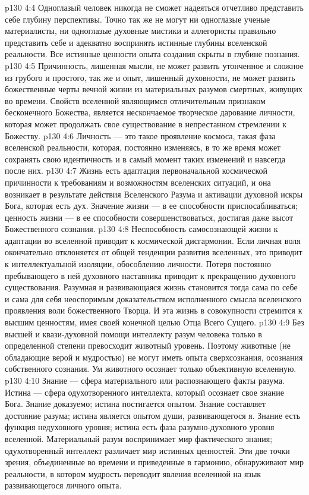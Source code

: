 \vs p130 4:4 Одноглазый человек никогда не сможет надеяться отчетливо представить себе глубину перспективы. Точно так же не могут ни одноглазые ученые материалисты, ни одноглазые духовные мистики и аллегористы правильно представить себе и адекватно воспринять истинные глубины вселенской реальности. Все истинные ценности опыта создания скрыты в глубине познания.
\vs p130 4:5 Причинность, лишенная мысли, не может развить утонченное и сложное из грубого и простого, так же и опыт, лишенный духовности, не может развить божественные черты вечной жизни из материальных разумов смертных, живущих во времени. Свойств вселенной являющимся отличительным признаком бесконечного Божества, является нескончаемое творческое дарование личности, которая может продолжать свое существование в непрестанном стремлении к Божеству.
\vs p130 4:6 Личность --- это такое проявление космоса, такая фаза вселенской реальности, которая, постоянно изменяясь, в то же время может сохранять свою идентичность и в самый момент таких изменений и навсегда после них.
\vs p130 4:7 Жизнь есть адаптация первоначальной космической причинности к требованиям и возможностям вселенских ситуаций, и она возникает в результате действия Вселенского Разума и активации духовной искры Бога, которая есть дух. Значение жизни --- в ее способности приспосабливаться; ценность жизни --- в ее способности совершенствоваться, достигая даже высот Божественного сознания.
\vs p130 4:8 Неспособность самосознающей жизни к адаптации во вселенной приводит к космической дисгармонии. Если личная воля окончательно отклоняется от общей тенденции развития вселенных, это приводит к интеллектуальной изоляции, обособлению личности. Потеря постоянно пребывающего в ней духовного наставника приводит к прекращению духовного существования. Разумная и развивающаяся жизнь становится тогда сама по себе и сама для себя неоспоримым доказательством исполненного смысла вселенского проявления воли божественного Творца. И эта жизнь в совокупности стремится к высшим ценностям, имея своей конечной целью Отца Всего Сущего.
\vs p130 4:9 Без высшей и квази\hyp{}духовной помощи интеллекту разум человека только в определенной степени превосходит животный уровень. Поэтому животные (не обладающие верой и мудростью) не могут иметь опыта сверхсознания, осознания собственного сознания. Ум животного осознает только объективную вселенную.
\vs p130 4:10 Знание --- сфера материального или распознающего факты разума. Истина --- сфера одухотворенного интеллекта, который осознает свое знание Бога. Знание доказуемо; истина постигается опытом. Знание составляет достояние разума; истина является опытом души, развивающегося я. Знание есть функция недуховного уровня; истина есть фаза разумно\hyp{}духовного уровня вселенной. Материальный разум воспринимает мир фактического знания; одухотворенный интеллект различает мир истинных ценностей. Эти две точки зрения, объединенные во времени и приведенные в гармонию, обнаруживают мир реальности, в котором мудрость переводит явления вселенной на язык развивающегося личного опыта.
